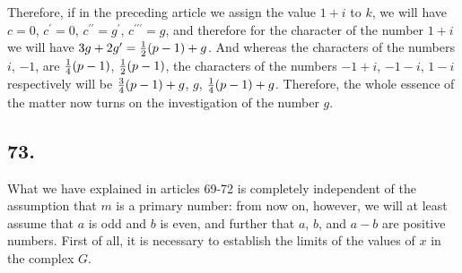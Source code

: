 \documentclass[twoside,12pt]{memoir}
\let\oldfrac\frac
\def\frac#1#2{\mathchoice{\tfrac{#1}{#2}}{\oldfrac{#1}{#2}}{\genfrac{}{}{}{2}{#1}{#2\mathstrut}}{\genfrac{}{}{}{3}{#1}{#2\mathstrut}}}
\begin{document}
Therefore, if in the preceding article we assign the value \(1+i\) to \(k\), we will have \(c=0\), \(c^{\prime}=0\), \(c^{\prime\prime}=g^{\prime}\), \(c^{\prime\prime\prime}=g\), and therefore for the character of the number \(1+i\) we will have \(3g+2g^{\prime} = \frac{1}{2}(p-1)+g\). And whereas the characters of the numbers \(i\), \(-1\), are \(\frac{1}{4}(p-1)\), \(\frac{1}{2}(p-1)\), the characters of the numbers \(-1+i\), \(-1-i\), \(1-i\) respectively will be \(\frac{3}{4}(p-1)+g\), \(g\), \(\frac{1}{4}(p-1)+g\). Therefore, the whole essence of the matter now turns on the investigation of the number \(g\).
%

\subsection*{73.}

What we have explained in articles 69-72 is completely independent of the assumption that \(m\) is a primary number: from now on, however, we will at least assume that \(a\) is odd and \(b\) is even, and further that \(a\), \(b\), and \(a-b\) are positive numbers. First of all, it is necessary to establish the limits of the values of \(x\) in the complex \(G\).
\end{document}
